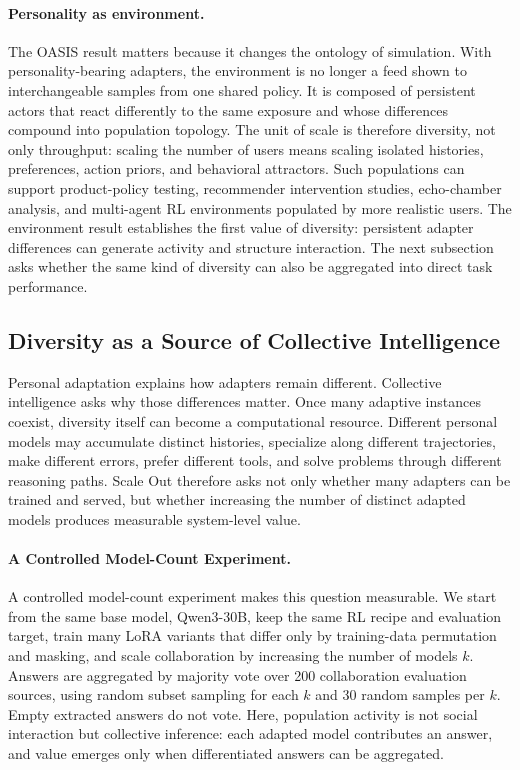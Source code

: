 \documentclass{llmxive}
\providecommand{\pony}[1]{#1}
\begin{document}
\paragraph{\pony{Personality as environment.}}
\pony{The OASIS result matters because it changes the ontology of simulation. With personality-bearing adapters, the environment is no longer a feed shown to interchangeable samples from one shared policy. It is composed of persistent actors that react differently to the same exposure and whose differences compound into population topology. The unit of scale is therefore diversity, not only throughput: scaling the number of users means scaling isolated histories, preferences, action priors, and behavioral attractors. Such populations can support product-policy testing, recommender intervention studies, echo-chamber analysis, and multi-agent RL environments populated by more realistic users. The environment result establishes the first value of diversity: persistent adapter differences can generate activity and structure interaction. The next subsection asks whether the same kind of diversity can also be aggregated into direct task performance.}

\subsection{\pony{Diversity as a Source of Collective Intelligence}}\label{subsec:population-capability}
\pony{Personal adaptation explains how adapters remain different. Collective intelligence asks why those differences matter. Once many adaptive instances coexist, diversity itself can become a computational resource. Different personal models may accumulate distinct histories, specialize along different trajectories, make different errors, prefer different tools, and solve problems through different reasoning paths. Scale Out therefore asks not only whether many adapters can be trained and served, but whether increasing the number of distinct adapted models produces measurable system-level value.}

\paragraph{A Controlled Model-Count Experiment.}
A controlled model-count experiment makes this question measurable. We start from the same base model, Qwen3-30B, keep the same RL recipe and evaluation target, train many LoRA variants that differ only by training-data permutation and masking, and scale collaboration by increasing the number of models \(k\). Answers are aggregated by majority vote over 200 collaboration evaluation sources, using random subset sampling for each \(k\) and 30 random samples per \(k\). Empty extracted answers do not vote. Here, population activity is not social interaction but collective inference: each adapted model contributes an answer, and value emerges only when differentiated answers can be aggregated.
\end{document}
